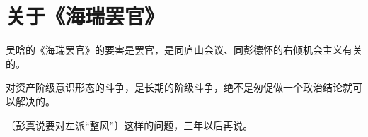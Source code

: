 \section[关于《海瑞罢官》（一九六六年二月八日）]{关于《海瑞罢官》}


吴晗的《海瑞罢官》的要害是罢官，是同庐山会议、同彭德怀的右倾机会主义有关的。

对资产阶级意识形态的斗争，是长期的阶级斗争，绝不是匆促做一个政治结论就可以解决的。

〔彭真说要对左派“整风”〕这样的问题，三年以后再说。

